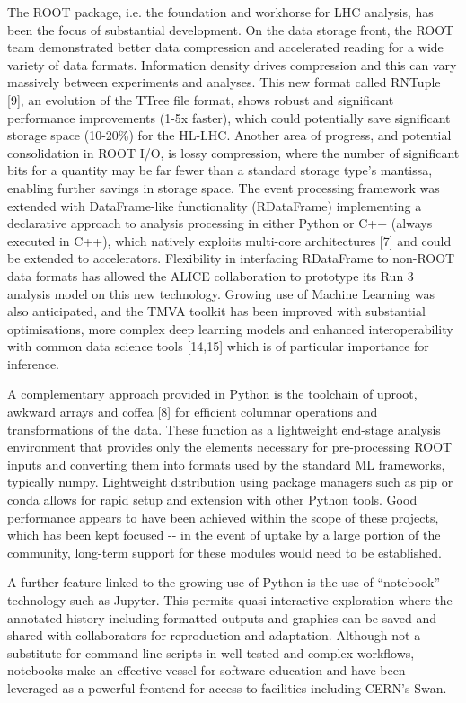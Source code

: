 \documentclass[11pt,a4paper]{article}
\begin{document}
The ROOT package, i.e. the foundation and workhorse for LHC analysis,
has been the focus of substantial development. On the data storage
front, the ROOT team demonstrated better data compression and
accelerated reading for a wide variety of data formats. Information
density drives compression and this can vary massively between
experiments and analyses. This new format called RNTuple {[}9{]}, an
evolution of the TTree file format, shows robust and significant
performance improvements (1-5x faster), which could potentially save
significant storage space (10-20\%) for the HL-LHC. Another area of
progress, and potential consolidation in ROOT I/O, is lossy compression,
where the number of significant bits for a quantity may be far fewer
than a standard storage type's mantissa, enabling further savings in
storage space. The event processing framework was extended with
DataFrame-like functionality (RDataFrame) implementing a declarative
approach to analysis processing in either Python or C++ (always executed
in C++), which natively exploits multi-core architectures {[}7{]} and
could be extended to accelerators. Flexibility in interfacing RDataFrame
to non-ROOT data formats has allowed the ALICE collaboration to
prototype its Run 3 analysis model on this new technology. Growing use
of Machine Learning was also anticipated, and the TMVA toolkit has been
improved with substantial optimisations, more complex deep learning
models and enhanced interoperability with common data science tools
{[}14,15{]} which is of particular importance for inference.

A complementary approach provided in Python is the toolchain of uproot,
awkward arrays and coffea {[}8{]} for efficient columnar operations and
transformations of the data. These function as a lightweight end-stage
analysis environment that provides only the elements necessary for
pre-processing ROOT inputs and converting them into formats used by the
standard ML frameworks, typically numpy. Lightweight distribution using
package managers such as pip or conda allows for rapid setup and
extension with other Python tools. Good performance appears to have been
achieved within the scope of these projects, which has been kept focused
-\/- in the event of uptake by a large portion of the community,
long-term support for these modules would need to be established.

A further feature linked to the growing use of Python is the use of
``notebook'' technology such as Jupyter. This permits quasi-interactive
exploration where the annotated history including formatted outputs and
graphics can be saved and shared with collaborators for reproduction and
adaptation. Although not a substitute for command line scripts in
well-tested and complex workflows, notebooks make an effective vessel
for software education and have been leveraged as a powerful frontend
for access to facilities including CERN's Swan.
\end{document}

